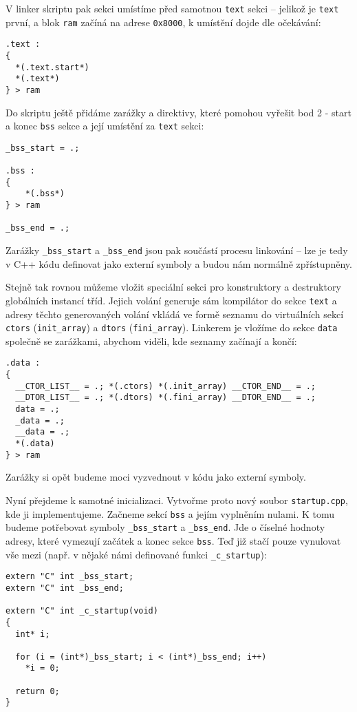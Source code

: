 \documentclass{article}
\begin{document}
V linker skriptu pak sekci umístíme před samotnou \texttt{text} sekci -- jelikož je \texttt{text} první, a blok \texttt{ram} začíná na adrese \texttt{0x8000}, k umístění dojde dle očekávání:

\begin{lstlisting}
.text :
{
  *(.text.start*)
  *(.text*)
} > ram
\end{lstlisting}

Do skriptu ještě přidáme zarážky a direktivy, které pomohou vyřešit bod 2 - start a konec \texttt{bss} sekce a její umístění za \texttt{text} sekci:

\begin{lstlisting}
_bss_start = .;

.bss :
{
	*(.bss*)
} > ram

_bss_end = .;
\end{lstlisting}

Zarážky \texttt{\_bss\_start} a \texttt{\_bss\_end} jsou pak součástí procesu linkování -- lze je tedy v C++ kódu definovat jako externí symboly a budou nám normálně zpřístupněny.

Stejně tak rovnou můžeme vložit speciální sekci pro konstruktory a destruktory globálních instancí tříd. Jejich volání generuje sám kompilátor do sekce \texttt{text} a adresy těchto generovaných volání vkládá ve formě seznamu do virtuálních sekcí \texttt{ctors} (\texttt{init\_array}) a \texttt{dtors} (\texttt{fini\_array}). Linkerem je vložíme do sekce \texttt{data} společně se zarážkami, abychom viděli, kde seznamy začínají a končí:

\begin{lstlisting}
.data :
{
  __CTOR_LIST__ = .; *(.ctors) *(.init_array) __CTOR_END__ = .; 
  __DTOR_LIST__ = .; *(.dtors) *(.fini_array) __DTOR_END__ = .;
  data = .;
  _data = .;
  __data = .;
  *(.data)
} > ram
\end{lstlisting}

Zarážky si opět budeme moci vyzvednout v kódu jako externí symboly.

Nyní přejdeme k samotné inicializaci. Vytvořme proto nový soubor \texttt{startup.cpp}, kde ji implementujeme. Začneme sekcí \texttt{bss} a jejím vyplněním nulami. K tomu budeme potřebovat symboly \texttt{\_bss\_start} a \texttt{\_bss\_end}. Jde o číselné hodnoty adresy, které vymezují začátek a konec sekce \texttt{bss}. Teď již stačí pouze vynulovat vše mezi (např. v nějaké námi definované funkci \texttt{\_c\_startup}):

\begin{lstlisting}
extern "C" int _bss_start;
extern "C" int _bss_end;

extern "C" int _c_startup(void)
{
  int* i;

  for (i = (int*)_bss_start; i < (int*)_bss_end; i++)
    *i = 0;
	
  return 0;
}
\end{lstlisting}
\end{document}
